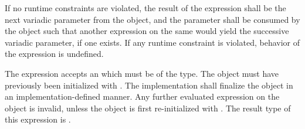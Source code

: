 \specsubsubitem
If no runtime constraints are violated, the result of the 
expression shall be the next variadic parameter from the 
object, and the parameter shall be consumed by the object such that another
 expression on the same  would
yield the successive variadic parameter, if one exists. If any runtime
constraint is violated, behavior of the  expression is
undefined.

\specsubsubitem
The  expression accepts an  which
must be of the  type. The object must have previously been
initialized with . The implementation shall finalize the
 object in an implementation-defined manner. Any further
evaluated  expression on the object is invalid, unless the
object is first re-initialized with . The result type of this
expression is .


\begin{grammar}
 \\
	 \\
	 \\
	 \\
	 \\
	 \\
	 \\
	 \\
\end{grammar}


\begin{grammar}
 \\
	 \\
	 \\
	 \\
	 \\
	  \\

 \oneof \\
	\terminal{-}
	\terminal{\textasciitilde}
	\terminal{!}
	\terminal{*}
	\terminal{\&}
\end{grammar}

